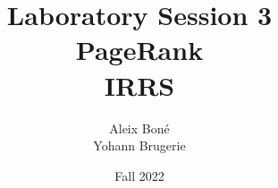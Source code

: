 


\usepackage{tikz}
\usepackage{pgfplots}
\pgfplotsset{compat=1.18}

\usepackage[separate-uncertainty]{siunitx}

\usepackage{fancyvrb}
\usepackage{tabularray}
\usepackage{fancyhdr}



\makeatletter
\g@addto@macro\@floatboxreset\centering
\makeatother




\renewcommand\and{\\[\baselineskip]}

\title{\Huge Laboratory Session 3 \\ PageRank \\[1em]
\Large IRRS}
\author{Aleix Boné \and Yohann Brugerie}
\date{Fall 2022}







\setlength{\parskip}{1em plus 0.5em minus 0.2em}





